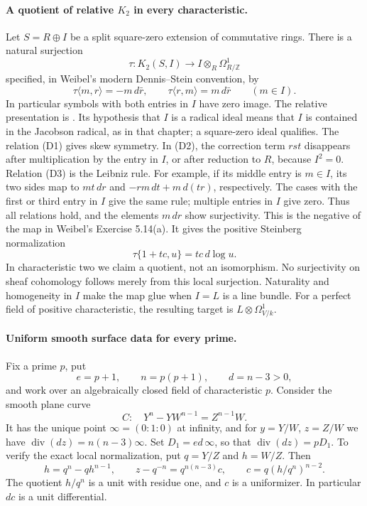 \paragraph{A quotient of relative $K_2$ in every characteristic.}
Let $S=R\oplus I$ be a split square-zero extension of commutative rings.
There is a natural surjection
\[
                \tau:K_2(S,I)\longrightarrow I\otimes_R\Omega^1_{R/\mathbb Z}
\]
specified, in Weibel's modern Dennis--Stein convention, by
\[
 \tau\langle m,r\rangle=-m\,d\bar r,\qquad
 \tau\langle r,m\rangle=m\,d\bar r\qquad(m\in I).
\]
In particular symbols with both entries in $I$ have zero image.
The relative presentation is
\citet[Chapter III, Theorem 5.11.1(b), p.~44]{frWeibelKbookIII}.
Its hypothesis that $I$ is a radical ideal means that $I$ is contained
in the Jacobson radical, as in that chapter; a square-zero ideal qualifies.
The relation (D1) gives skew symmetry. In (D2), the correction term
$rst$ disappears after multiplication by the entry in $I$, or after
reduction to $R$, because $I^2=0$. Relation (D3) is the Leibniz rule.
For example, if its middle entry is $m\in I$, its two sides map to
$mt\,dr$ and $-rm\,dt+m\,d(tr)$, respectively. The cases with the
first or third entry in $I$ give the same rule; multiple entries in $I$
give zero. Thus all relations hold, and the elements $m\,dr$ show
surjectivity. This is the negative of the map in Weibel's
Exercise 5.14(a). It gives the positive Steinberg normalization
\[
                          \tau\{1+tc,u\}=tc\,d\log u.
\]
In characteristic two we claim a quotient, not an isomorphism.
No surjectivity on sheaf cohomology follows merely from this local
surjection. Naturality and homogeneity in $I$ make the map glue when
$I=L$ is a line bundle. For a perfect field of positive characteristic,
the resulting target is $L\otimes\Omega^1_{V/k}$.

\paragraph{Uniform smooth surface data for every prime.}
Fix a prime $p$, put
\[
 e=p+1,\qquad n=p(p+1),\qquad d=n-3>0,
\]
and work over an algebraically closed field of characteristic $p$.
Consider the smooth plane curve
\[
 C:\quad Y^n-YW^{n-1}=Z^{n-1}W.
\]
It has the unique point $\infty=(0:1:0)$ at infinity, and for
$y=Y/W$, $z=Z/W$ we have
$\operatorname{div}(dz)=n(n-3)\infty$.
Set $D_1=ed\,\infty$, so that $\operatorname{div}(dz)=pD_1$.
To verify the exact local normalization, put $q=Y/Z$ and $h=W/Z$.
Then
\[
 h=q^n-qh^{n-1},\qquad
 z-q^{-n}=q^{n(n-3)}c,\qquad
 c=q(h/q^n)^{n-2}.
\]
The quotient $h/q^n$ is a unit with residue one, and $c$ is a
uniformizer. In particular $dc$ is a unit differential.

